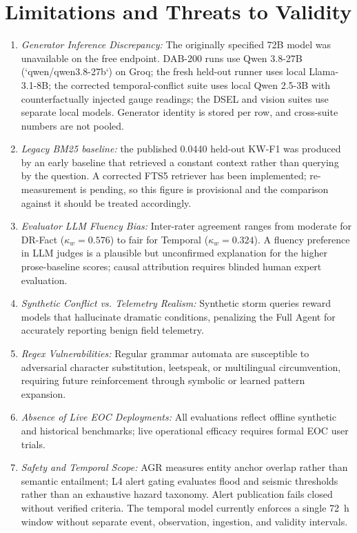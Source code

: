 \documentclass[conference]{IEEEtran}
\begin{document}
\section{Limitations and Threats to Validity}
\label{sec:threats}
\begin{enumerate}
    \item \textit{Generator Inference Discrepancy:} The originally specified 72B model was unavailable on the free endpoint. DAB-200 runs use Qwen 3.8-27B (`qwen/qwen3.8-27b`) on Groq; the fresh held-out runner uses local Llama-3.1-8B; the corrected temporal-conflict suite uses local Qwen 2.5-3B with counterfactually injected gauge readings; the DSEL and vision suites use separate local models. Generator identity is stored per row, and cross-suite numbers are not pooled.
    \item \textit{Legacy BM25 baseline:} the published 0.0440 held-out KW-F1 was produced by an early baseline that retrieved a constant context rather than querying by the question. A corrected FTS5 retriever has been implemented; re-measurement is pending, so this figure is provisional and the comparison against it should be treated accordingly.
    \item \textit{Evaluator LLM Fluency Bias:} Inter-rater agreement ranges from moderate for DR-Fact ($\kappa_w=0.576$) to fair for Temporal ($\kappa_w=0.324$). A fluency preference in LLM judges is a plausible but unconfirmed explanation for the higher prose-baseline scores; causal attribution requires blinded human expert evaluation.
    \item \textit{Synthetic Conflict vs. Telemetry Realism:} Synthetic storm queries reward models that hallucinate dramatic conditions, penalizing the Full Agent for accurately reporting benign field telemetry.
    \item \textit{Regex Vulnerabilities:} Regular grammar automata are susceptible to adversarial character substitution, leetspeak, or multilingual circumvention, requiring future reinforcement through symbolic or learned pattern expansion.
    \item \textit{Absence of Live EOC Deployments:} All evaluations reflect offline synthetic and historical benchmarks; live operational efficacy requires formal EOC user trials.
    \item \textit{Safety and Temporal Scope:} AGR measures entity anchor overlap rather than semantic entailment; L4 alert gating evaluates flood and seismic thresholds rather than an exhaustive hazard taxonomy. Alert publication fails closed without verified criteria. The temporal model currently enforces a single 72~h window without separate event, observation, ingestion, and validity intervals.
\end{enumerate}
\end{document}
